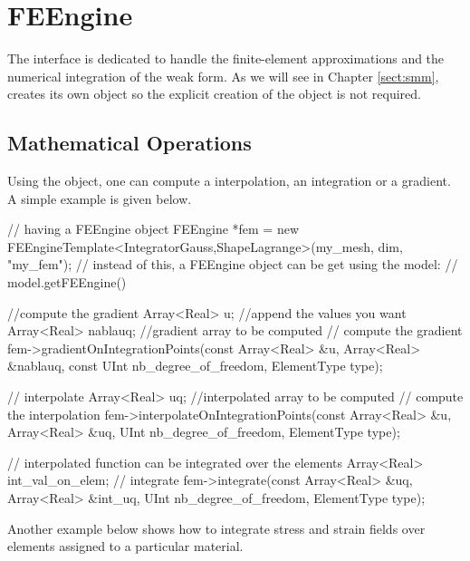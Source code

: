 \chapter{FEEngine}
\label{chap:feengine}
The  interface is dedicated to handle the
finite-element approximations and the numerical integration of the
weak form. As we will see in Chapter \ref{sect:smm}, 
creates its own  object so the explicit creation of the
object is not required.

\section{Mathematical Operations\label{sect:fe:mathop}}
Using the  object, one can compute a interpolation, an
integration or a gradient. A simple example is given below.

\begin{cpp}
// having a FEEngine object
FEEngine *fem = new FEEngineTemplate<IntegratorGauss,ShapeLagrange>(my_mesh, 
                                                                    dim, 
                                                                    "my_fem");
// instead of this, a FEEngine object can be get using the model: 
// model.getFEEngine()

//compute the gradient
Array<Real> u; //append the values you want
Array<Real> nablauq; //gradient array to be computed
// compute the gradient
fem->gradientOnIntegrationPoints(const Array<Real> &u,
				 Array<Real> &nablauq,
				 const UInt nb_degree_of_freedom,
				 ElementType type);

// interpolate
Array<Real> uq; //interpolated array to be computed
// compute the interpolation
fem->interpolateOnIntegrationPoints(const Array<Real> &u,
                                    Array<Real> &uq,
                                    UInt nb_degree_of_freedom,
                                    ElementType type);

// interpolated function can be integrated over the elements
Array<Real> int_val_on_elem;
// integrate
fem->integrate(const Array<Real> &uq, 
               Array<Real> &int_uq, 
               UInt nb_degree_of_freedom,
               ElementType type);
\end{cpp}

Another example below shows how to integrate stress and strain fields
over elements assigned to a particular material.

